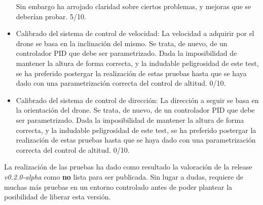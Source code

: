 \begin{itemize}
Sin embargo ha arrojado claridad sobre ciertos problemas, y mejoras que se deberían probar. 5/10.
 
 \item Calibrado del sistema de control de velocidad: La velocidad a adquirir por el drone se basa en la inclinación del mismo. Se trata, de nuevo, de un controlador PID que debe ser parametrizado. Dada la imposibilidad de mantener la altura de forma correcta, y la indudable peligrosidad de este test, se ha preferido postergar la realización de estas pruebas hasta que se haya dado con una parametrización correcta del control de altitud. 0/10.
 
 \item Calibrado del sistema de control de dirección: La dirección a seguir se basa en la orientación del drone. Se trata, de nuevo, de un controlador PID que debe ser parametrizado. Dada la imposibilidad de mantener la altura de forma correcta, y la indudable peligrosidad de este test, se ha preferido postergar la realización de estas pruebas hasta que se haya dado con una parametrización correcta del control de altitud. 0/10.
\end{itemize}


La realización de las pruebas ha dado como resultado la valoración de la release \emph{v0.2.0-alpha} como \textbf{no} lista para ser publicada. Sin lugar a dudas, requiere de muchas más pruebas en un entorno controlado antes de poder plantear la posibilidad de liberar esta versión. 

